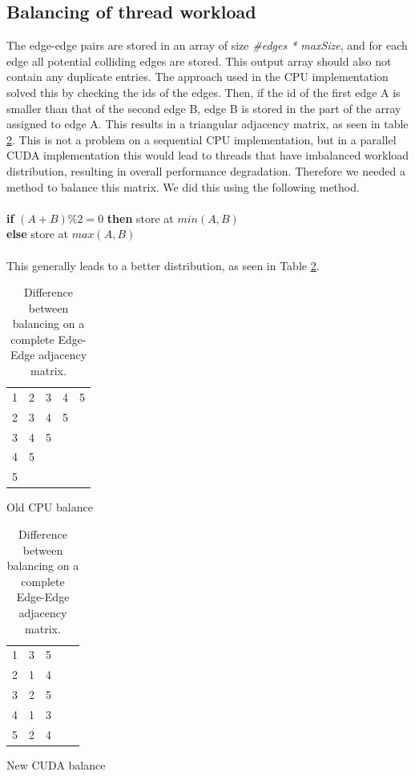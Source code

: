 \subsection{Balancing of thread workload}
The edge-edge pairs are stored in an array of size \textit{\#edges * maxSize}, and for each edge all potential colliding edges are stored. This output array should also not contain any duplicate entries. The approach used in the CPU implementation solved this by checking the ids of the edges. Then, if the id of the first edge A is smaller than that of the second edge B, edge B is stored in the part of the array assigned to edge A. This results in a triangular adjacency matrix, as seen in table \ref{table:balance}. This is not a problem on a sequential CPU implementation, but in a parallel CUDA implementation this would lead to threads that have imbalanced workload distribution, resulting in overall performance degradation. Therefore we needed a method to balance this matrix. We did this using the following method.\\
\\
\indent \indent \textbf{if} $(A + B) \% 2 = 0$ \textbf{then} store at $min(A,B)$\\
\indent \indent \textbf{else} store at $max(A,B)$ \\
\\
This generally leads to a better distribution, as seen in Table \ref{table:balance}.

\begin{table}[!htb]
    	\begin{subtable}{.5\linewidth}
		\centering
		\begin{tabular}{ c || c | c | c | c }
			1 & 2 & 3 & 4 & 5 \\
			2 & 3 & 4 & 5 \\
			3 & 4 & 5 & \\
			4 & 5 & & \\
			5 & & &\\
		\end{tabular}
		\caption{Old CPU balance}
	\end{subtable}%
    	\begin{subtable}{.5\linewidth}
		\centering        
		\begin{tabular}{ c || c | c | c | c }
			1 & 3 & 5 &  &  \\
			2 & 1 & 4 &  &\\
			3 & 2 & 5 &  &\\
			4 & 1 & 3 &  &\\
			5 & 2 & 4 &  &\\
		\end{tabular}
		\caption{New CUDA balance}
	\end{subtable} 
	\caption{Difference between balancing on a complete Edge-Edge adjacency matrix.}
	\label{table:balance}
\end{table}

